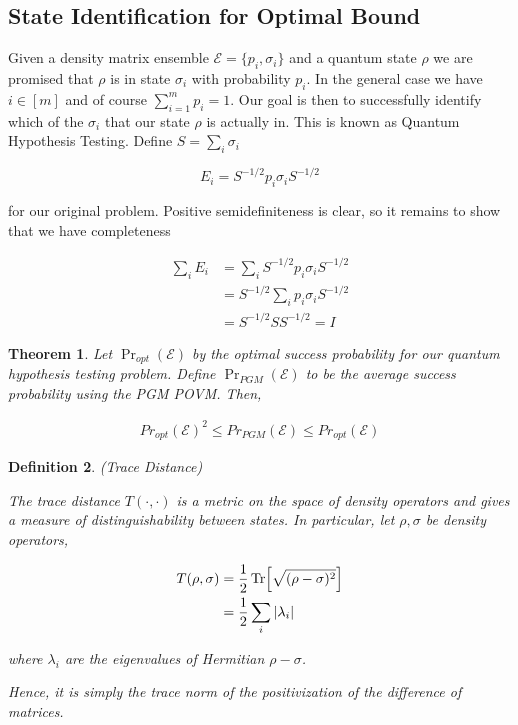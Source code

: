 \documentclass[12]{amsart}
\newcommand\0{\mathbf{0}}
\newcommand\<{\langle}
\renewcommand\>{\rangle}
\newtheorem{theorem}{Theorem}[section]
\newtheorem{definition}[theorem]{Definition}
\begin{document}
\subsection{State Identification for Optimal Bound}

Given a density matrix ensemble $\mathcal{E} = \{p_i, \sigma_i\}$ and a quantum state $\rho$ we are promised that $\rho$ is in state $\sigma_i$ with probability $p_i$. In the general case we have $i \in [m]$ and of course $\sum_{i=1}^m p_i = 1$. Our goal is then to successfully identify which of the $\sigma_i$ that our state $\rho$ is actually in. This is known as Quantum Hypothesis Testing. Define $S = \sum_i \sigma_i$

$$E_i = S^{-1/2}p_i \sigma_i S^{-1/2}$$

for our original problem. Positive semidefiniteness is clear, so it remains to show that we have completeness

\begin{align*}
\sum_i E_i &= \sum_i S^{-1/2}p_i \sigma_i S^{-1/2}\\
&=  S^{-1/2} \sum_i p_i \sigma_i S^{-1/2} \\
&= S^{-1/2} S S^{-1/2} = I
\end{align*}

\begin{theorem}
Let $\Pr_{opt}(\mathcal{E})$ by the optimal success probability for our 	quantum hypothesis testing problem. Define $\Pr_{PGM}(\mathcal{E})$ to be the average success probability using the PGM POVM. Then,

\begin{align*}
Pr_{opt}(\mathcal{E})^2 \leq Pr_{PGM}(\mathcal{E}) \leq 	Pr_{opt}(\mathcal{E})
\end{align*}

\end{theorem}

\begin{definition}
(Trace Distance)

The trace distance $T(\cdot , \cdot)$ is a metric on the space of density operators and gives a measure of distinguishability between states. In particular, let $\rho, \sigma$ be density operators,

\begin{align*}
	T(\rho, \sigma) &= \frac{1}{2} \Tr [\sqrt{(\rho - \sigma)^2}] \\
	&= \frac{1}{2} \sum_i |\lambda_i|
\end{align*}

where $\lambda_i$ are the eigenvalues of Hermitian $\rho - \sigma$.

Hence, it is simply the trace norm of the positivization of the difference of matrices.

\end{definition}
\end{document}
